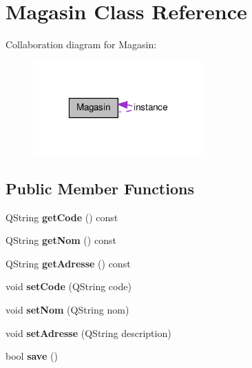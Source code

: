 \hypertarget{class_magasin}{
\section{Magasin Class Reference}
\label{d6/dbb/class_magasin}
}


Collaboration diagram for Magasin:\nopagebreak
\begin{figure}[H]
\begin{center}
\leavevmode
\includegraphics[width=187pt]{d2/d88/class_magasin__coll__graph}
\end{center}
\end{figure}
\subsection*{Public Member Functions}
\begin{DoxyCompactItemize}
\item 
\hypertarget{class_magasin_a2cbc709e2a2ff257c94fc72ee1008d29}{
QString {\bfseries getCode} () const }
\label{d6/dbb/class_magasin_a2cbc709e2a2ff257c94fc72ee1008d29}

\item 
\hypertarget{class_magasin_a193e49a031ae32bc04fc45a8f4f1fe71}{
QString {\bfseries getNom} () const }
\label{d6/dbb/class_magasin_a193e49a031ae32bc04fc45a8f4f1fe71}

\item 
\hypertarget{class_magasin_af2a69b549629c3ad6ad34374af8457bd}{
QString {\bfseries getAdresse} () const }
\label{d6/dbb/class_magasin_af2a69b549629c3ad6ad34374af8457bd}

\item 
\hypertarget{class_magasin_a320db7f9bbb684db8a288b83b28189c4}{
void {\bfseries setCode} (QString code)}
\label{d6/dbb/class_magasin_a320db7f9bbb684db8a288b83b28189c4}

\item 
\hypertarget{class_magasin_ae07c3c19b79204ffece1b339dc27b678}{
void {\bfseries setNom} (QString nom)}
\label{d6/dbb/class_magasin_ae07c3c19b79204ffece1b339dc27b678}

\item 
\hypertarget{class_magasin_a516a929cb3e31f9a892d1167b970e85d}{
void {\bfseries setAdresse} (QString description)}
\label{d6/dbb/class_magasin_a516a929cb3e31f9a892d1167b970e85d}

\item 
\hypertarget{class_magasin_ae0d6c929e52662f750368cf3e68a3337}{
bool {\bfseries save} ()}
\label{d6/dbb/class_magasin_ae0d6c929e52662f750368cf3e68a3337}

\end{DoxyCompactItemize}
